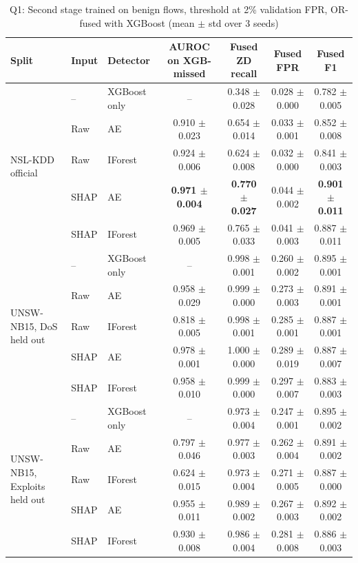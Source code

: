 \documentclass[conference]{IEEEtran}
\begin{document}
\begin{table}[t]
\caption{Q1: Second stage trained on benign flows, threshold at 2\% validation FPR, OR-fused with XGBoost (mean $\pm$ std over 3 seeds)}
\label{tab:q1}
\centering
\begin{tabular}{lllcccc}
\toprule
Split & Input & Detector & AUROC on XGB-missed & Fused ZD recall & Fused FPR & Fused F1 \\
\midrule
\multirow{5}{*}{NSL-KDD official} & -- & XGBoost only & -- & 0.348 $\pm$ 0.028 & 0.028 $\pm$ 0.000 & 0.782 $\pm$ 0.005 \\
 & Raw & AE & 0.910 $\pm$ 0.023 & 0.654 $\pm$ 0.014 & 0.033 $\pm$ 0.001 & 0.852 $\pm$ 0.008 \\
 & Raw & IForest & 0.924 $\pm$ 0.006 & 0.624 $\pm$ 0.008 & 0.032 $\pm$ 0.000 & 0.841 $\pm$ 0.003 \\
 & SHAP & AE & \textbf{0.971 $\pm$ 0.004} & \textbf{0.770 $\pm$ 0.027} & 0.044 $\pm$ 0.002 & \textbf{0.901 $\pm$ 0.011} \\
 & SHAP & IForest & 0.969 $\pm$ 0.005 & 0.765 $\pm$ 0.033 & 0.041 $\pm$ 0.003 & 0.887 $\pm$ 0.011 \\
\midrule
\multirow{5}{*}{UNSW-NB15, DoS held out} & -- & XGBoost only & -- & 0.998 $\pm$ 0.001 & 0.260 $\pm$ 0.002 & 0.895 $\pm$ 0.001 \\
 & Raw & AE & 0.958 $\pm$ 0.029 & 0.999 $\pm$ 0.000 & 0.273 $\pm$ 0.003 & 0.891 $\pm$ 0.001 \\
 & Raw & IForest & 0.818 $\pm$ 0.005 & 0.998 $\pm$ 0.001 & 0.285 $\pm$ 0.001 & 0.887 $\pm$ 0.001 \\
 & SHAP & AE & 0.978 $\pm$ 0.001 & 1.000 $\pm$ 0.000 & 0.289 $\pm$ 0.019 & 0.887 $\pm$ 0.007 \\
 & SHAP & IForest & 0.958 $\pm$ 0.010 & 0.999 $\pm$ 0.000 & 0.297 $\pm$ 0.007 & 0.883 $\pm$ 0.003 \\
\midrule
\multirow{5}{*}{UNSW-NB15, Exploits held out} & -- & XGBoost only & -- & 0.973 $\pm$ 0.004 & 0.247 $\pm$ 0.001 & 0.895 $\pm$ 0.002 \\
 & Raw & AE & 0.797 $\pm$ 0.046 & 0.977 $\pm$ 0.003 & 0.262 $\pm$ 0.004 & 0.891 $\pm$ 0.002 \\
 & Raw & IForest & 0.624 $\pm$ 0.015 & 0.973 $\pm$ 0.004 & 0.271 $\pm$ 0.005 & 0.887 $\pm$ 0.000 \\
 & SHAP & AE & 0.955 $\pm$ 0.011 & 0.989 $\pm$ 0.002 & 0.267 $\pm$ 0.003 & 0.892 $\pm$ 0.002 \\
 & SHAP & IForest & 0.930 $\pm$ 0.008 & 0.986 $\pm$ 0.004 & 0.281 $\pm$ 0.008 & 0.886 $\pm$ 0.003 \\

\end{tabular}
\end{table}
\end{document}
